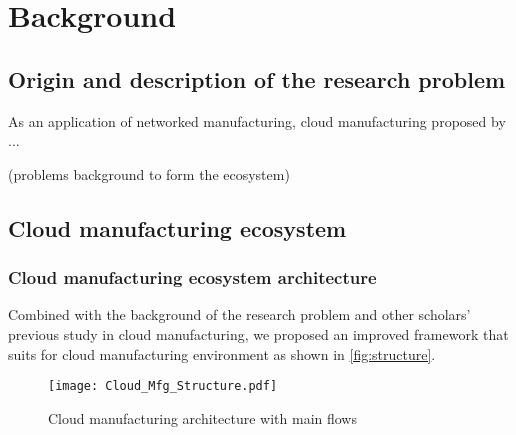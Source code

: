 \section{Background} %
\label{sec:background}

\subsection{Origin and description of the research problem} %
\label{sub:origin_and_description_of_the_problem}

As an application of networked manufacturing, cloud manufacturing proposed by ...

(problems background to form the ecosystem)

\subsection{Cloud manufacturing ecosystem} %
\label{sub:cloud_manufacturing_ecosystem}

\subsubsection{Cloud manufacturing ecosystem architecture}

Combined with the background of the research problem and other scholars' previous study in cloud manufacturing, we proposed an improved framework that suits for cloud manufacturing environment as shown in \autoref{fig:structure}.
\begin{figure}[htbp]
\centering
\texttt{[image: Cloud\_Mfg\_Structure.pdf]}
\caption{Cloud manufacturing architecture with main flows}
\label{fig:structure}
\end{figure}

